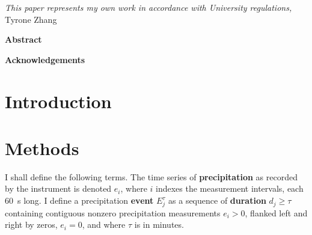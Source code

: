 \documentclass[11pt]{report}
\begin{document}



\thispagestyle{empty}
\vspace*{3in}
\begin{center}
\emph{This paper represents my own work in accordance with University regulations,} \\
Tyrone Zhang %
\end{center}
\clearpage

\begin{center}
\Large \textbf{Abstract}
\end{center}
 
 \clearpage

\begin{center}
\Large \textbf{Acknowledgements}
\end{center}

\clearpage

\thispagestyle{empty}
\tableofcontents
\clearpage

\listoffigures 
\listoftables
\clearpage

\fancyhead{}
\fancyfoot{}
\pagestyle{fancyplain}

{\newpage\renewcommand{\thepage}{\arabic{page}}\setcounter{page}{1}}


\section{Introduction \label{sec:introduction}}

% 

\section{Methods \label{sec:methods}}

I shall define the following terms. The time series of
\textbf{precipitation} as recorded by the instrument is denoted $e_i$,
where $i$ indexes the measurement intervals, each 60~s long. I define
a precipitation \textbf{event} $E_j^\tau $ as a sequence of
\textbf{duration} $d_j\ge \tau$ containing contiguous nonzero
precipitation measurements $e_i>0$, flanked left and right by zeros,
$e_i=0$, and where $\tau$ is in minutes.
\end{document}
